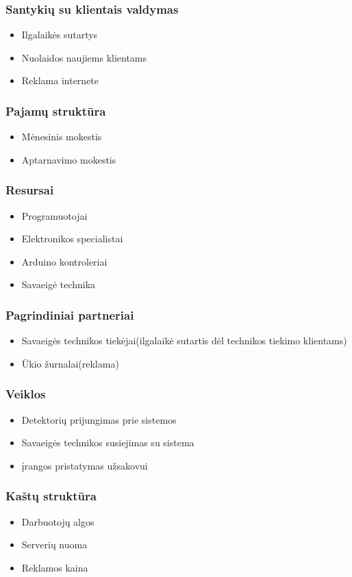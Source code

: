 \documentclass[oneside]{VUMIFPSkursinis}
\begin{document}
	\subsubsection{Santykių su klientais valdymas}
	\begin{itemize}
	\item Ilgalaikės sutartys
	\item Nuolaidos naujiems klientams
	\item Reklama internete
	\end{itemize}
	\subsubsection{Pajamų struktūra}
	\begin{itemize}
	\item Mėnesinis mokestis
	\item Aptarnavimo mokestis
	\end{itemize}
	\subsubsection{Resursai}
	\begin{itemize}
	\item Programuotojai
	\item Elektronikos specialistai
	\item Arduino kontroleriai
	\item Savaeigė technika
	\end{itemize}
	\subsubsection{Pagrindiniai partneriai}
	\begin{itemize}
	\item Savaeigės technikos tiekėjai(ilgalaikė sutartis dėl technikos tiekimo klientams)
	\item Ūkio žurnalai(reklama)
	\end{itemize}
	\subsubsection{Veiklos}
	\begin{itemize}
	\item Detektorių prijungimas prie sistemos
	\item Savaeigės technikos susiejimas su sistema
	\item įrangos pristatymas užsakovui
	\end{itemize}
	\subsubsection{Kaštų struktūra}
	\begin{itemize}
	\item Darbuotojų algos
	\item Serverių nuoma
	\item Reklamos kaina
	\end{itemize}
	
\end{document}
